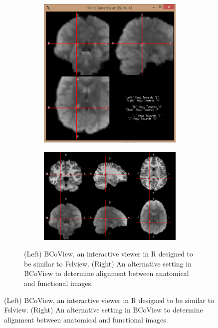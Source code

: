 \documentclass{nature}
\begin{document}
{\begin{figure}[tb]
\begin{figure}
\begin{subfigure}{.5\textwidth}
\includegraphics[width=.9\linewidth]{fig/brainconductor/50002_smooth_after.png}
\end{subfigure}%
\begin{subfigure}{.5\textwidth}
  \centering
 
\includegraphics[width=.9\linewidth]{fig/brainconductor/50002_ventricles_20151225.png}
\end{subfigure}
\caption{(Left) BCoView, an interactive viewer in R designed to be similar to
Fslview. (Right) An alternative setting 
in BCoView to determine alignment between anatomical and functional images.
}
\label{fig:viewer}
\end{figure}


\end{figure}}
\end{document}
